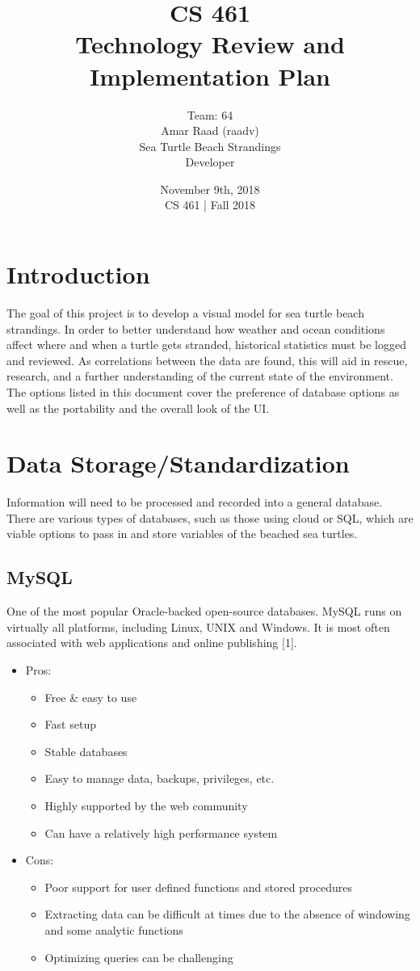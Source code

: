 \documentclass{article}
\title{CS 461 \\ Technology Review and \\ Implementation Plan \\}
\author{Team: 64 \\ Amar Raad (raadv) \\ Sea Turtle Beach Strandings \\ Developer}
\date{November 9th, 2018 \\ CS 461 | Fall 2018}
\begin{document}
\maketitle

\newpage
\tableofcontents
\newpage
\section{Introduction}
The goal of this project is to develop a visual model for sea turtle beach strandings. In order to better understand how weather and ocean conditions affect where and when a turtle gets stranded, historical statistics must be logged and reviewed. As correlations between the data are found, this will aid in rescue, research, and a further understanding of the current state of the environment. The options listed in this document cover the preference of database options as well as the portability and the overall look of the UI.
\newline \newline \newline \newline

\section{Data Storage/Standardization}
Information will need to be processed and recorded into a general database. There are various types of databases, such as those using cloud or SQL, which are viable options to pass in and store variables of the beached sea turtles.
\newline 

\subsection{MySQL}
One of the most popular Oracle-backed open-source databases. MySQL runs on virtually all platforms, including Linux, UNIX and Windows. It is most often associated with web applications and online publishing [1].
\begin{itemize}
\item Pros:
\begin{itemize}
\item Free \& easy to use
\item Fast setup
\item Stable databases
\item Easy to manage data, backups, privileges, etc.
\item Highly supported by the web community
\item Can have a relatively high performance system 
\end{itemize}
\item Cons:
\begin{itemize}
\item Poor support for user defined functions and stored procedures
\item Extracting data can be difficult at times due to the absence of windowing and some analytic functions
\item Optimizing queries can be challenging
\end{itemize}
\end{itemize}
\end{document}
